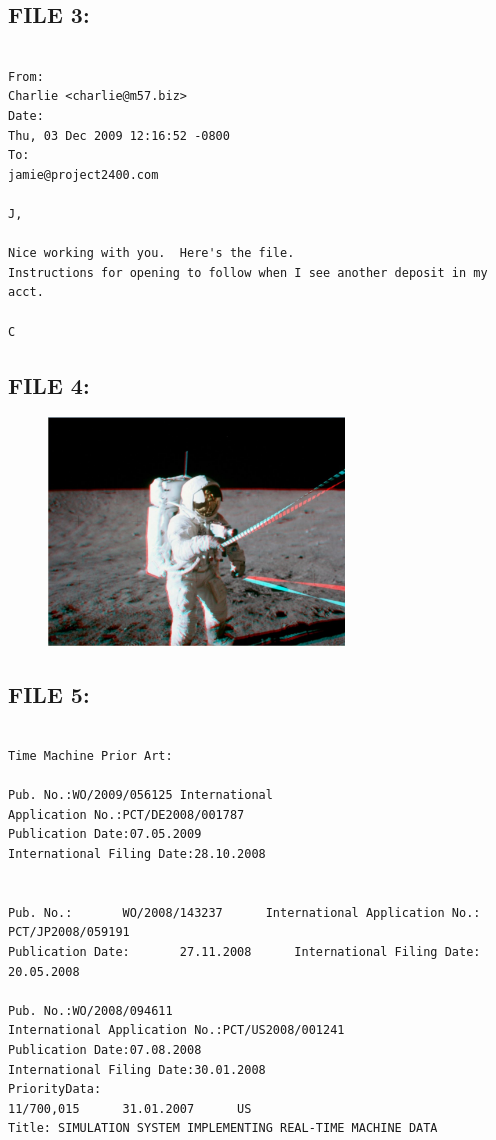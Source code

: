 \subsection{FILE 3:}
\label{sec:charlie_daten_3}

\begin{lstlisting}

From:
Charlie <charlie@m57.biz>
Date:
Thu, 03 Dec 2009 12:16:52 -0800
To:
jamie@project2400.com

J,

Nice working with you.  Here's the file. 
Instructions for opening to follow when I see another deposit in my acct.

C

\end{lstlisting}

\subsection{FILE 4:}
\label{sec:charlie_daten_4}

\begin{figure}[H]
	\centering
	\includegraphics[width=0.7\textwidth]{daten/pics/astronaut1.jpg}
\end{figure}

\subsection{FILE 5:}
\label{sec:charlie_daten_5}

\begin{lstlisting}

Time Machine Prior Art:

Pub. No.:WO/2009/056125 International 
Application No.:PCT/DE2008/001787 
Publication Date:07.05.2009 
International Filing Date:28.10.2008


Pub. No.:		WO/2008/143237		International Application No.:		PCT/JP2008/059191
Publication Date:		27.11.2008		International Filing Date:		20.05.2008

Pub. No.:WO/2008/094611 
International Application No.:PCT/US2008/001241 
Publication Date:07.08.2008 
International Filing Date:30.01.2008
PriorityData:
11/700,015		31.01.2007		US
Title: SIMULATION SYSTEM IMPLEMENTING REAL-TIME MACHINE DATA


\end{lstlisting}

